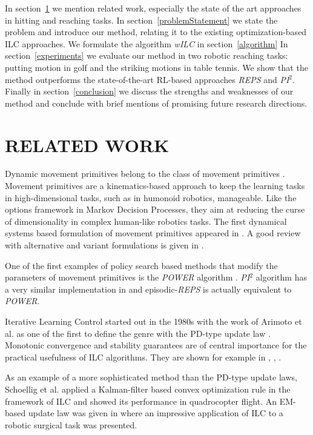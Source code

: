 In section~\ref{relatedWork} we mention related work, especially the state of the art approaches in hitting and reaching tasks. In section~\ref{problemStatement} we state the problem and introduce our method, relating it to the existing optimization-based ILC approaches. We formulate the algorithm \emph{wILC} in section~\ref{algorithm} In section~\ref{experiments} we evaluate our method in two robotic reaching tasks: putting motion in golf and the striking motions in table tennis. We show that the method outperforms the state-of-the-art RL-based approaches \emph{REPS} and \emph{PI$^{2}$}. Finally in section~\ref{conclusion} we discuss the strengths and weaknesses of our method and conclude with brief mentions of promising future research directions.

\section{RELATED WORK}\label{relatedWork}

Dynamic movement primitives belong to the class of movement primitives \cite{Flash85}. Movement primitives are a kinematics-based approach to keep the learning tasks in high-dimensional tasks, such as in humonoid robotics, manageable. Like the options framework in Markov Decision Processes, they aim at reducing the curse of dimensionality in complex human-like robotics tasks. The first dynamical systems based formulation of movement primitives appeared in \cite{Ijspeert02}. A good review with alternative and variant formulations is given in \cite{Ijspeert13}.

One of the first examples of policy search based methods that modify the parameters of movement primitives is the \emph{POWER} algorithm \cite{Kober08}. \emph{PI$^{2}$} algorithm has a very similar implementation in \cite{Theodorou10} and episodic-\emph{REPS} \cite{Peter10} is actually equivalent to \emph{POWER}.

Iterative Learning Control started out in the 1980s with the work of Arimoto et al. \cite{Arimoto84} as one of the first to define the genre with the PD-type update law \cite{Bristow06}. Monotonic convergence and stability guarantees are of central importance for the practical usefulness of ILC algorithms. They are shown for example in \cite{Bristow06}, \cite{Norrloef02}, \cite{Longman2000}.

As an example of a more sophisticated method than the PD-type update laws, Schoellig et al. \cite{Schoellig12} applied a Kalman-filter based convex optimization rule in the framework of ILC and showed its performance in quadrocopter flight. An EM-based update law was given in \cite{Berg10} where an impressive application of ILC to a robotic surgical task was presented.

